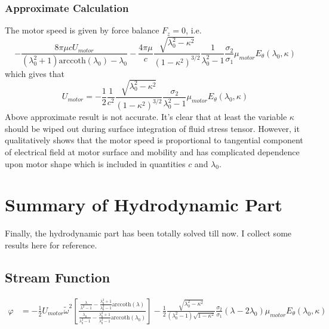 \documentclass[fontsize=11pt, %
                             paper=a4, %
                             twoside, %
                             captions=tableheading,
                             index=totoc,
                             hyperref]{labbook}
\begin{document}
\begin{addmargin}[4cm]{0cm}
\subsubsection{Approximate Calculation}
The motor speed is given by force balance $F_z=0$, i.e.
\begin{equation}
-\frac{8\pi\mu c U_{motor}}{(\lambda_0^2+1)\mathrm{arccoth}(\lambda_0)-\lambda_0}-\frac{4\pi\mu}{c}\frac{\sqrt{\lambda_0^2-\kappa^2}}{(1-\kappa^2)^{3/2}}\frac{1}{\lambda_0^2-1}\frac{\sigma_2}{\sigma_1}\mu_{motor}E_\theta(\lambda_0,\kappa)
\end{equation}
which gives that
\begin{equation}
U_{motor}=-\frac{1}{2}\frac{1}{c^2}\frac{\sqrt{\lambda_0^2-\kappa^2}}{(1-\kappa^2)^{3/2}}\frac{\sigma_2}{\lambda^2_0-1}\mu_{motor}E_\theta(\lambda_0,\kappa)
\end{equation}
Above approximate result is not accurate. It's clear that at least the variable $\kappa$ should be wiped out during surface integration of fluid stress tensor. However, it qualitatively shows that the motor speed is proportional to tangential component of electrical field at motor surface and mobility and has complicated dependence upon motor shape which is included in quantities $c$ and $\lambda_0$.
\section{Summary of Hydrodynamic Part}
Finally, the hydrodynamic part has been totally solved till now. I collect some results here for reference.
\subsection{Stream Function}
\begin{equation}
\begin{aligned}
\varphi&=-\frac{1}{2}U_{motor}\tilde{\omega}^2\left[\frac{\frac{\lambda}{\lambda^2-1}-\frac{\lambda_0^2+1}{\lambda_0^2-1}\mathrm{arccoth}(\lambda)}{\frac{\lambda_0}{\lambda_0^2-1}-\frac{\lambda_0^2+1}{\lambda_0^2-1}\mathrm{arccoth}(\lambda_0)}\right]-\frac{1}{2}\frac{\sqrt{\lambda_0^2-\kappa^2}}{(\lambda_0^2-1)\sqrt{1-\kappa^2}}\frac{\sigma_2}{\sigma_1}(\lambda-2\lambda_0)\mu_{motor}E_\theta(\lambda_0,\kappa)
\end{aligned}
\end{equation}

\end{addmargin}
\end{document}
